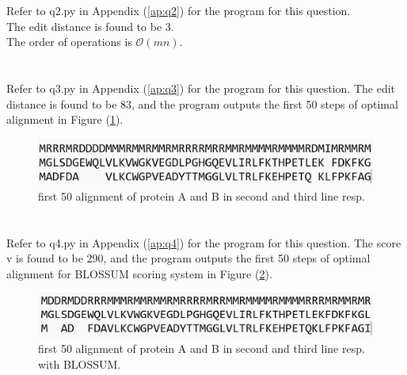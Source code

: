 \documentclass{article}
\begin{document}
	\section{}
	Refer to q2.py in Appendix (\ref{ap:q2}) for the program for this question.\\
	The edit distance is found to be 3.\\
	The order of operations is $ \mathcal{O} (mn) $.
	
	\section{}
	Refer to q3.py in Appendix (\ref{ap:q3}) for the program for this question.
	The edit distance is found to be 83, and the program outputs the first 50 steps of optimal alignment in Figure (\ref{fig:Q3_1}).\\
	
	\begin{figure}[h]
		\centering
		\includegraphics{figures/q3_1.jpg}
		\caption{first 50 alignment of protein A and B in second and third line resp.}
		\label{fig:Q3_1}
		
	\end{figure}

	\section{}
	
	Refer to q4.py in Appendix (\ref{ap:q4}) for the program for this question.
	The score v is found to be 290, and the program outputs the first 50 steps of optimal alignment for BLOSSUM scoring system in Figure (\ref{fig:Q4_1}).
	\begin{figure}[h]
		\centering
		\includegraphics{figures/q4_1.jpg}
		\caption{first 50 alignment of protein A and B in second and third line resp. with BLOSSUM.}
		\label{fig:Q4_1}
		
	\end{figure}


\end{document}
